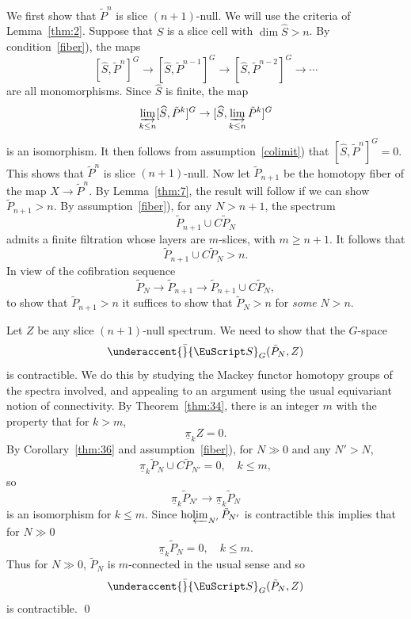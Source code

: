 \documentclass{amsart}
\theoremstyle{definition}
\theoremstyle{remark}
\newenvironment{pf}{\bigskip{\em Proof:\/}}{\qed\medskip}
\newcounter{thmItem}
\newcommand{\thmItemref}[1]
 	 {{\rm \ref{#1})}}
\newcommand{\spectra}{\EuScript S}
\DeclareMathOperator{\ho}{ho}
\newcommand{\pim}{\underline{\pi}}
\newcommand{\gspectra}[1]{\underaccent{\bar}{\spectra}_{#1}}
\newcommand{\holim}{\ho\!\varprojlim}
\newcommand{\slicecell}{\widehat{S}}
\begin{document}
\begin{pf}
We first show that $\tilde P^{n}$ is slice $(n+1)$-null.  We
will use the criteria of Lemma~\ref{thm:2}.  Suppose that $\slicecell$
is a slice cell with $\dim\slicecell >n$.  By
condition~\thmItemref{fiber}, the maps
\[
[\slicecell,\tilde P^{n} ]^{G} \to 
[\slicecell,\tilde P^{n-1} ]^{G} \to 
[\slicecell,\tilde P^{n-2} ]^{G} \to\cdots
\]
are all monomorphisms.  Since $\slicecell$ is finite, the map 
\[
\varinjlim_{k\le n}[\slicecell,\tilde P^{k} ]^{G} \to 
[\slicecell,\varinjlim_{k\le n}\tilde P^{k} ]^{G}
\]
is an isomorphism.  It then follows from
assumption~\thmItemref{colimit} that $[\slicecell, \tilde
P^{n}]^{G}=0$.  This shows that $\tilde P^{n}$ is slice $(n+1)$-null.
Now let $\tilde P_{n+1}$ be the homotopy fiber of the map $X\to \tilde
P^{n}$.  By Lemma~\ref{thm:7}, the result will follow if we can show
$\tilde P_{n+1}>n$.  By assumption~\thmItemref{fiber}, for any
$N>n+1$, the spectrum
\[
\tilde P_{n+1}\cup C\tilde P_{N}
\]
admits a finite filtration whose layers are $m$-slices, with $m\ge
n+1$.   It follows that 
\[
\tilde P_{n+1}\cup C\tilde P_{N}>n.
\]
In view of the cofibration sequence
\[
\tilde P_{N}\to \tilde P_{n+1}\to \tilde P_{n+1}\cup C\tilde P_{N},
\]
to show that $\tilde P_{n+1}>n$ it suffices to show that $\tilde
P_{N}>n$ for {\em some} $N>n$.

Let $Z$ be any slice $(n+1)$-null spectrum.  We
need to show that the $G$-space
\[
\gspectra{G}(\tilde P_{N},Z)
\]
is contractible.  We do this by studying the Mackey functor homotopy
groups of the spectra involved, and appealing to an argument using the
usual equivariant notion of connectivity.  By Theorem~\ref{thm:34},
there is an integer $m$ with the property that for $k>m$,
\[
\pim_{k}Z= 0.
\]
By Corollary~\ref{thm:36} and assumption~\thmItemref{fiber}, for
$N\gg0$ and any $N'>N$, 
\[
\pim_{k}\tilde P_{N}\cup C\tilde P_{N'} = 0, \quad k\le m,
\]
so
\[
\pim_{k}\tilde P_{N'}\to \pim_{k}\tilde P_{N}
\]
is an isomorphism for $k\le m$.  Since $\holim_{N'}\tilde P_{N'}$ is
contractible this implies that for $N\gg0$
\[
\pim_{k}\tilde P_{N}=0, \quad k\le m.
\]
Thus for $N\gg0$,  $\tilde P_{N}$ is $m$-connected in the usual sense
and so 
\[
\gspectra{G}(\tilde P_{N},Z)
\]
is contractible.
\end{pf}
\end{document}
